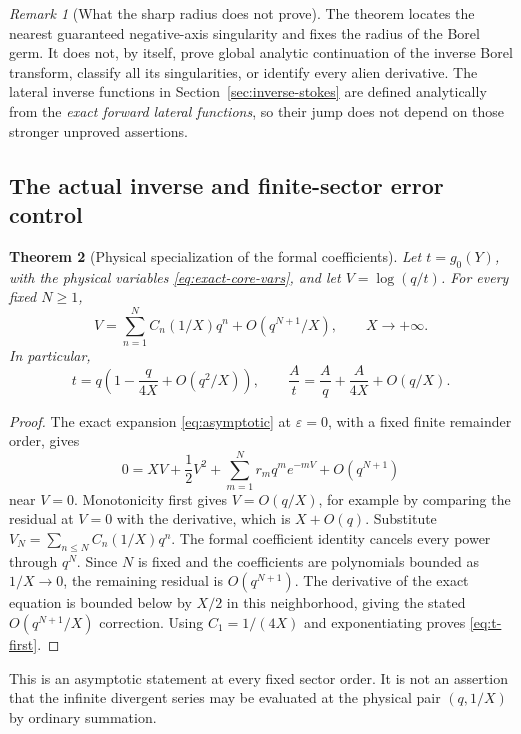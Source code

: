 \documentclass[11pt,a4paper]{article}
\numberwithin{equation}{section}
\newtheorem{theorem}{Theorem}[section]
\theoremstyle{definition}\newtheorem{definition}[theorem]{Definition}
\theoremstyle{remark}\newtheorem{remark}[theorem]{Remark}
\newcommand{\eps}{\varepsilon}
\begin{document}
\begin{remark}[What the sharp radius does not prove]
The theorem locates the nearest guaranteed negative-axis singularity and
fixes the radius of the Borel germ. It does not, by itself, prove global
analytic continuation of the inverse Borel transform, classify all its
singularities, or identify every alien derivative. The lateral inverse
functions in Section~\ref{sec:inverse-stokes} are defined analytically
from the \emph{exact forward lateral functions}, so their jump does not
depend on those stronger unproved assertions.
\end{remark}

\subsection{The actual inverse and finite-sector error control}
\begin{theorem}[Physical specialization of the formal coefficients]
\label{thm:physical-sectors}
Let $t=g_0(Y)$, with the physical variables \eqref{eq:exact-core-vars},
and let $V=\log(q/t)$. For every fixed $N\ge1$,
\begin{equation}\label{eq:physical-V}
 V=\sum_{n=1}^{N}C_n(1/X)q^n+O(q^{N+1}/X),
 \qquad X\to+\infty.
\end{equation}
In particular,
\begin{equation}\label{eq:t-first}
 t=q\left(1-\frac{q}{4X}+O(q^2/X)\right),
 \qquad
 \frac A t=\frac A q+\frac{A}{4X}+O(q/X).
\end{equation}
\end{theorem}
\begin{proof}
The exact expansion \eqref{eq:asymptotic} at $\eps=0$, with a
fixed finite remainder order, gives
\[
 0=XV+\frac12V^2+\sum_{m=1}^{N}r_mq^m e^{-mV}+O(q^{N+1})
\]
near $V=0$. Monotonicity first gives $V=O(q/X)$, for example by
comparing the residual at $V=0$ with the derivative, which is
$X+O(q)$. Substitute
$V_N=\sum_{n\le N}C_n(1/X)q^n$.
The formal coefficient identity cancels every power through $q^N$.
Since $N$ is fixed and the coefficients are polynomials bounded as
$1/X\to0$, the remaining residual is $O(q^{N+1})$.
The derivative of the exact equation is bounded below by $X/2$ in
this neighborhood, giving the stated $O(q^{N+1}/X)$ correction.
Using $C_1=1/(4X)$ and exponentiating proves \eqref{eq:t-first}.
\end{proof}

This is an asymptotic statement at every fixed sector order. It is not
an assertion that the infinite divergent series may be evaluated at the
physical pair $(q,1/X)$ by ordinary summation.
\end{document}
